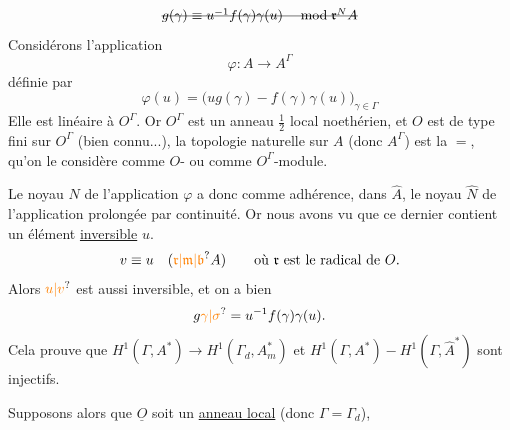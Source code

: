 \[
\deleted{g(\gamma)\equiv u^{-1}f(\gamma)\gamma(u)\quad\bmod\mathfrak r^N A}
\]
Considérons l'application 
\[
\varphi:A\longrightarrow A^\Gamma
\]
définie par
\[
\varphi(u)=\bigl(ug(\gamma)-f(\gamma)\gamma(u)\bigr)_{\gamma\in\Gamma}
\]
Elle est linéaire  à $O^\Gamma$. Or $O^\Gamma$ est un anneau $\frac12$ local noethérien, et $O$ est  de type fini sur $O^\Gamma$ (bien connu...),  la topologie naturelle sur $A$ (donc $A^\Gamma$) est la $=$, qu'on le considère comme $O$- ou comme $O^\Gamma$-module.

Le noyau $N$ de l'application $\varphi$ a donc comme adhérence, dans $\widehat{A}$, le noyau $\widehat{N}$ de l'application prolongée par continuité. Or nous avons vu que ce dernier contient un élément \uline{inversible} $u$.  
\[
v\equiv u\quad(\unsure{\mathfrak r|\mathfrak m|\mathfrak b}A)\qquad\text{où }\mathfrak r\text{ est le radical de }O.
\]
Alors $\unsure{u|v}$ est aussi inversible, et on a bien
\[
g\unsure{\gamma|\sigma}=u^{-1}f(\gamma)\gamma(u).
\]
\margin{$\Vert$}
Cela prouve que $H^1(\Gamma,A^*)\longrightarrow H^1(\Gamma_d,A_m^*)$ et $H^1(\Gamma,A^*)-H^1(\Gamma,\widehat{A}^*)$ sont injectifs.

Supposons alors que $\underline{O}$ soit un \uline{anneau local} (donc $\Gamma=\Gamma_d$),  


